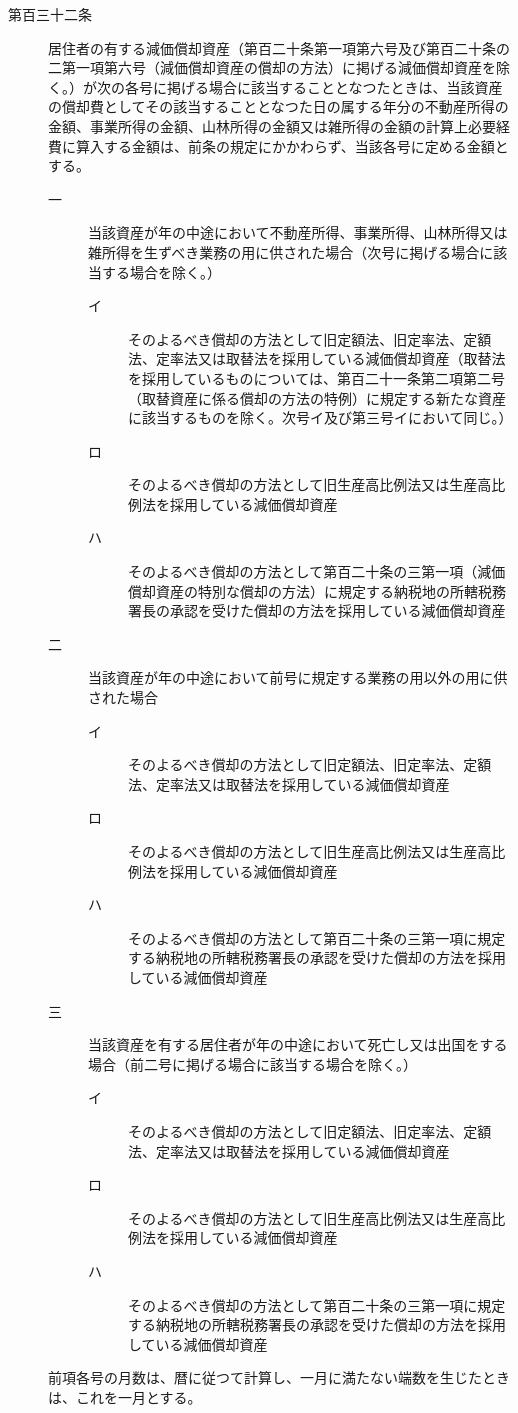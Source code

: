 \documentclass[twocolumn,a4j,10pt]{ltjtarticle}
\begin{document}
\begin{description}
\item[第百三十二条]居住者の有する減価償却資産（第百二十条第一項第六号及び第百二十条の二第一項第六号（減価償却資産の償却の方法）に掲げる減価償却資産を除く。）が次の各号に掲げる場合に該当することとなつたときは、当該資産の償却費としてその該当することとなつた日の属する年分の不動産所得の金額、事業所得の金額、山林所得の金額又は雑所得の金額の計算上必要経費に算入する金額は、前条の規定にかかわらず、当該各号に定める金額とする。
\begin{description}
\item[一]当該資産が年の中途において不動産所得、事業所得、山林所得又は雑所得を生ずべき業務の用に供された場合（次号に掲げる場合に該当する場合を除く。）
\begin{description}
\item[イ]そのよるべき償却の方法として旧定額法、旧定率法、定額法、定率法又は取替法を採用している減価償却資産（取替法を採用しているものについては、第百二十一条第二項第二号（取替資産に係る償却の方法の特例）に規定する新たな資産に該当するものを除く。次号イ及び第三号イにおいて同じ。）
\item[ロ]そのよるべき償却の方法として旧生産高比例法又は生産高比例法を採用している減価償却資産
\item[ハ]そのよるべき償却の方法として第百二十条の三第一項（減価償却資産の特別な償却の方法）に規定する納税地の所轄税務署長の承認を受けた償却の方法を採用している減価償却資産
\end{description}
\item[二]当該資産が年の中途において前号に規定する業務の用以外の用に供された場合
\begin{description}
\item[イ]そのよるべき償却の方法として旧定額法、旧定率法、定額法、定率法又は取替法を採用している減価償却資産
\item[ロ]そのよるべき償却の方法として旧生産高比例法又は生産高比例法を採用している減価償却資産
\item[ハ]そのよるべき償却の方法として第百二十条の三第一項に規定する納税地の所轄税務署長の承認を受けた償却の方法を採用している減価償却資産
\end{description}
\item[三]当該資産を有する居住者が年の中途において死亡し又は出国をする場合（前二号に掲げる場合に該当する場合を除く。）
\begin{description}
\item[イ]そのよるべき償却の方法として旧定額法、旧定率法、定額法、定率法又は取替法を採用している減価償却資産
\item[ロ]そのよるべき償却の方法として旧生産高比例法又は生産高比例法を採用している減価償却資産
\item[ハ]そのよるべき償却の方法として第百二十条の三第一項に規定する納税地の所轄税務署長の承認を受けた償却の方法を採用している減価償却資産
\end{description}
\end{description}
\item[]前項各号の月数は、暦に従つて計算し、一月に満たない端数を生じたときは、これを一月とする。
\end{description}
\end{document}
